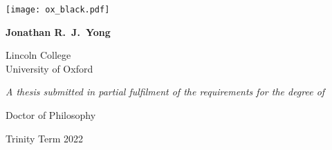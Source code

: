 \hspace{0pt}
\vfill
\begin{center}
    \Huge
    \textbf{\thesistitle}

    \vspace{1.0cm}

    \texttt{[image: ox\_black.pdf]}

    \vspace{0.6cm}

    \LARGE
    \textbf{Jonathan R.\ J.\ Yong}

    \vspace{0.4cm}

    \Large
    Lincoln College \\ University of Oxford

    \vspace{1.0cm}

    \large
    \textit{A thesis submitted in partial fulfilment of the requirements for the degree of}

    \Large
    Doctor of Philosophy
    
    Trinity Term 2022
\end{center}
\thispagestyle{empty}
\vfill
\hspace{0pt}
\newpage
